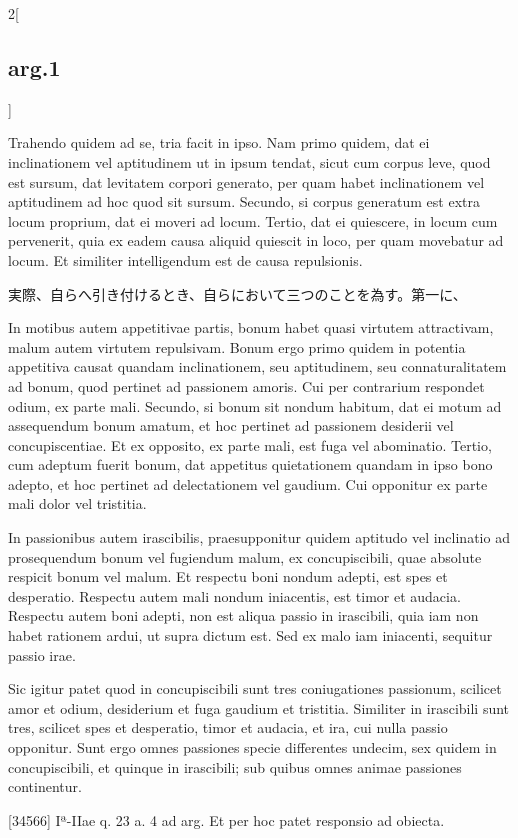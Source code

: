 \documentclass[paper=a4paper,fontsize=10pt,jafontsize=9pt,titlepage]{jlreq}
\begin{document}
\begin{paracol}{2}[\subsection{arg.1}]
\switchcolumn*

Trahendo quidem ad se, tria facit in ipso. Nam primo quidem,
dat ei inclinationem vel aptitudinem ut in ipsum tendat, sicut cum
corpus leve, quod est sursum, dat levitatem corpori generato, per quam
habet inclinationem vel aptitudinem ad hoc quod sit sursum. Secundo, si
corpus generatum est extra locum proprium, dat ei moveri ad
locum. Tertio, dat ei quiescere, in locum cum pervenerit, quia ex eadem
causa aliquid quiescit in loco, per quam movebatur ad locum. Et
similiter intelligendum est de causa repulsionis.

\switchcolumn

実際、自らへ引き付けるとき、自らにおいて三つのことを為す。第一に、

\switchcolumn*

In motibus autem
appetitivae partis, bonum habet quasi virtutem attractivam, malum autem
virtutem repulsivam. Bonum ergo primo quidem in potentia appetitiva
causat quandam inclinationem, seu aptitudinem, seu connaturalitatem ad
bonum, quod pertinet ad passionem amoris. Cui per contrarium respondet
odium, ex parte mali. Secundo, si bonum sit nondum habitum, dat ei motum
ad assequendum bonum amatum, et hoc pertinet ad passionem desiderii vel
concupiscentiae. Et ex opposito, ex parte mali, est fuga vel
abominatio. Tertio, cum adeptum fuerit bonum, dat appetitus quietationem
quandam in ipso bono adepto, et hoc pertinet ad delectationem vel
gaudium. Cui opponitur ex parte mali dolor vel tristitia.

\switchcolumn

In passionibus
autem irascibilis, praesupponitur quidem aptitudo vel inclinatio ad
prosequendum bonum vel fugiendum malum, ex concupiscibili, quae absolute
respicit bonum vel malum. Et respectu boni nondum adepti, est spes et
desperatio. Respectu autem mali nondum iniacentis, est timor et
audacia. Respectu autem boni adepti, non est aliqua passio in
irascibili, quia iam non habet rationem ardui, ut supra dictum est. Sed
ex malo iam iniacenti, sequitur passio irae.

\switchcolumn*

Sic igitur patet quod in
concupiscibili sunt tres coniugationes passionum, scilicet amor et
odium, desiderium et fuga gaudium et tristitia. Similiter in irascibili
sunt tres, scilicet spes et desperatio, timor et audacia, et ira, cui
nulla passio opponitur. Sunt ergo omnes passiones specie differentes
undecim, sex quidem in concupiscibili, et quinque in irascibili; sub
quibus omnes animae passiones continentur.

\switchcolumn

[34566] Iª-IIae q. 23 a. 4 ad arg.
Et per hoc patet responsio ad obiecta.

\end{paracol}
\end{document}
